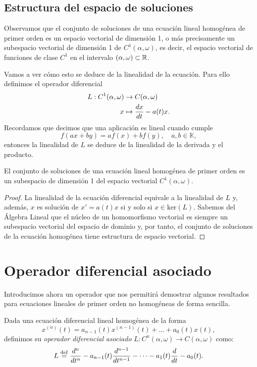 \documentclass[../ecuaciones_diferenciales.tex]{subfiles}
\begin{document}
\subsection{Estructura del espacio de soluciones}

Observamos que el conjunto de soluciones de una ecuación lineal homogénea de
primer orden es un espacio vectorial de dimensión 1, o más precisamente un
subespacio vectorial de dimensión 1 de \(C^1(\alpha, \omega)\), es decir, el
espacio vectorial de funciones de clase \(C^1\) en el intervalo
\((\alpha, \omega) \subset \mathbb{R}\).

Vamos a ver cómo esto se deduce de la linealidad de la ecuación. Para ello
definimos el operador diferencial
\begin{align*}
	L : C^1(\alpha, \omega) & \to C(\alpha, \omega)              \\
	x                       & \mapsto \frac{d x}{\mathop{d\!} t} - a(t)x.
\end{align*}
Recordamos que decimos que una aplicación es lineal cuando cumple
\[f(ax + by) = af(x) + bf(y), \quad a, b \in \mathbb{K},\] entonces la
linealidad de \(L\) se deduce de la linealidad de la derivada y el producto.
 
\begin{theorem}
	El conjunto de soluciones de una ecuación lineal homogénea de
	primer orden es un subespacio de dimensión 1 del espacio vectorial 
	\(C^1(\alpha, \omega)\).
\end{theorem}

\begin{proof}
    La linealidad de la ecuación diferencial equivale a la linealidad de \(L\)
    y, además, \(x\) es solución de \(x' = a(t)x\) si y solo si
    \(x \in \text{ker}(L)\). Sabemos del Álgebra Lineal que el núcleo de un
    homomorfismo vectorial es siempre un subespacio vectorial del espacio de
    dominio y, por tanto, el conjunto de soluciones de la ecuación homogénea
    tiene estructura de espacio vectorial.
\end{proof}

\section{Operador diferencial asociado}

Introducimos ahora un operador que nos permitirá demostrar algunos resultados
para ecuaciones lineales de primer orden no homogéneas de forma sencilla.

\begin{definition}
	Dada una ecuación diferencial lineal homogénea de la forma
	\[x^{(n)}(t) = a_{n-1}(t)x^{(n - 1)}(t) + \dots + a_0(t)x(t),\]
	definimos su \emph{operador diferencial asociado} 
	\(L : C^n(\alpha, \omega) \to C(\alpha, \omega)\) como:
	\[L \overset{\operatorname{def}}{=} \frac{d^n}{\mathop{d\!} t^n} - a_{n-1}(t)\frac{d^{n-1}}{\mathop{d\!} t^{n-1}}
		- \dots - a_1(t)\frac{d}{\mathop{d\!} t} - a_0(t).\]
\end{definition}
\end{document}
